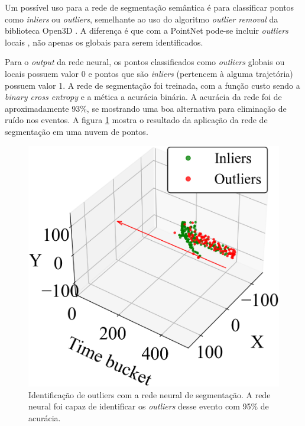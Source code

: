 \documentclass[a4paper,12pt,oneside]{book}
\begin{document}
\par Um possível uso para a rede de segmentação semântica é para classificar pontos como \textit{inliers} ou \textit{outliers}, semelhante ao uso do algoritmo \textit{outlier removal} da biblioteca Open3D \cite{open3d}. A diferença é que com a PointNet pode-se incluir \textit{outliers} locais \cite{RF_pc}, não apenas os globais para serem identificados.

\par Para o \textit{output} da rede neural, os pontos classificados como \textit{outliers} globais ou locais possuem valor 0 e pontos que são \textit{inliers} (pertencem à alguma trajetória) possuem valor 1. A rede de segmentação foi treinada, com a função custo sendo a \textit{binary cross entropy} e a mética a acurácia binária. A acurácia da rede foi de aproximadamente 93\%, se mostrando uma boa alternativa para eliminação de ruído nos eventos. A figura \ref{fig:pointnet_segment_exs} mostra o resultado da aplicação da rede de segmentação em uma nuvem de pontos.

\begin{figure}[H]
    \centering
    \includegraphics[scale = 0.4]{figs/pointnet_seg_ex1.png}
    \caption{Identificação de outliers com a rede neural de segmentação. A rede neural foi capaz de identificar os \textit{outliers} desse evento com 95\% de acurácia.}
    \label{fig:pointnet_segment_exs}
\end{figure}
\end{document}
